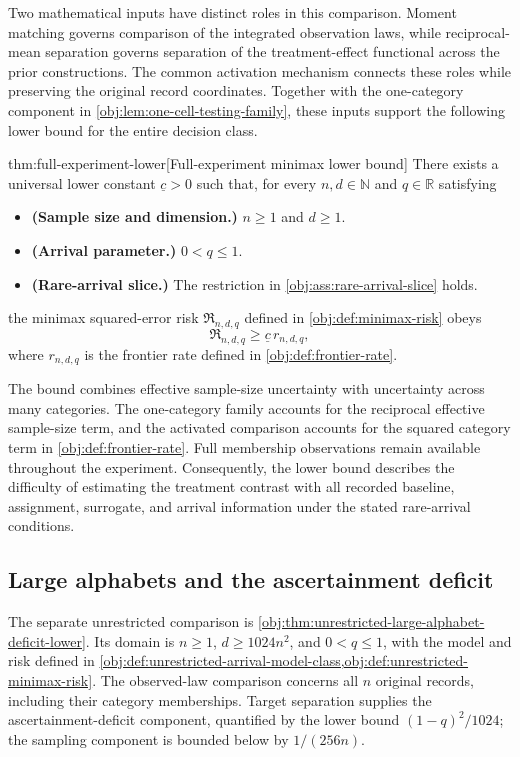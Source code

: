 \documentclass[11pt]{article}
\begin{document}
Two mathematical inputs have distinct roles in this comparison. Moment matching governs comparison of the integrated observation laws, while reciprocal-mean separation governs separation of the treatment-effect functional across the prior constructions. The common activation mechanism connects these roles while preserving the original record coordinates. Together with the one-category component in \cref{obj:lem:one-cell-testing-family}, these inputs support the following lower bound for the entire decision class.

\begin{theoremv}{thm:full-experiment-lower}[Full-experiment minimax lower bound]
There exists a universal lower constant \(\underline c>0\) such that, for every \(n,d\in\mathbb N\) and \(q\in\mathbb R\) satisfying
\begin{itemize}
\item \textbf{(Sample size and dimension.)} \(n\ge1\) and \(d\ge1\).
\item \textbf{(Arrival parameter.)} \(0<q\le1\).
\item \textbf{(Rare-arrival slice.)} The restriction in \cref{obj:ass:rare-arrival-slice} holds.
\end{itemize}
the minimax squared-error risk \(\mathfrak R_{n,d,q}\) defined in \cref{obj:def:minimax-risk} obeys
\[
\mathfrak R_{n,d,q}\ge \underline c\,r_{n,d,q},
\]
where \(r_{n,d,q}\) is the frontier rate defined in \cref{obj:def:frontier-rate}.
\end{theoremv}

The bound combines effective sample-size uncertainty with uncertainty across many categories. The one-category family accounts for the reciprocal effective sample-size term, and the activated comparison accounts for the squared category term in \cref{obj:def:frontier-rate}. Full membership observations remain available throughout the experiment. Consequently, the lower bound describes the difficulty of estimating the treatment contrast with all recorded baseline, assignment, surrogate, and arrival information under the stated rare-arrival conditions.

\subsection{Large alphabets and the ascertainment deficit}

The separate unrestricted comparison is \cref{obj:thm:unrestricted-large-alphabet-deficit-lower}. Its domain is \(n\ge1\), \(d\ge1024n^2\), and \(0<q\le1\), with the model and risk defined in \cref{obj:def:unrestricted-arrival-model-class,obj:def:unrestricted-minimax-risk}. The observed-law comparison concerns all \(n\) original records, including their category memberships. Target separation supplies the ascertainment-deficit component, quantified by the lower bound \((1-q)^2/1024\); the sampling component is bounded below by \(1/(256n)\).
\end{document}
